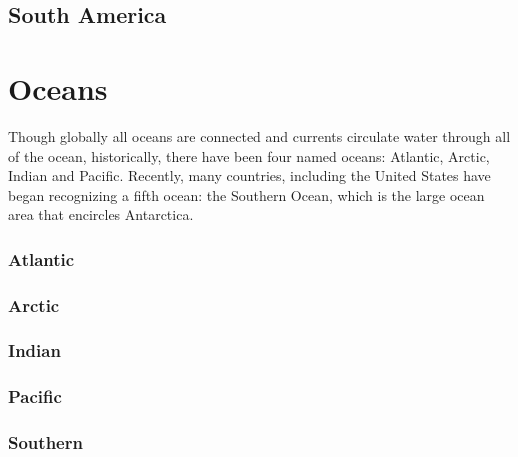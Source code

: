 			
	\subsection{South America}


	\section{Oceans}
		Though globally all oceans are connected and currents circulate water through all of the ocean, historically, there have been four named oceans: Atlantic, Arctic, Indian and Pacific. Recently, many countries, including the United States have began recognizing a fifth ocean: the Southern Ocean, which is the large ocean area that encircles Antarctica.  
		\subsubsection{Atlantic}
		\subsubsection{Arctic}
		\subsubsection{Indian}
		\subsubsection{Pacific}
		\subsubsection{Southern}
		
		
